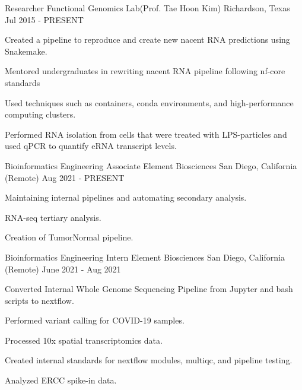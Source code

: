 

\begin{cventries}

	\cventry
	{Researcher} %
	{Functional Genomics Lab(Prof. Tae Hoon Kim)} %
	{Richardson, Texas} %
	{Jul 2015 - PRESENT} %
	{
		\begin{cvitems} %
			\item {Created a pipeline to reproduce and create new nacent RNA
			            predictions using Snakemake.}
			\item {Mentored undergraduates in rewriting nacent RNA pipeline following nf-core standards}
			\item {Used techniques such as containers, conda environments, and
			            high-performance computing clusters.}
			\item {Performed RNA isolation from cells that were treated with LPS-particles and used qPCR to quantify eRNA transcript levels.}
		\end{cvitems}
	}

	\cventry
	{Bioinformatics Engineering Associate} %
	{Element Biosciences} %
	{San Diego, California (Remote)} %
	{Aug 2021 - PRESENT} %
	{
		\begin{cvitems} %
			\item {Maintaining internal pipelines and automating secondary analysis.}
			\item {RNA-seq tertiary analysis.}
			\item {Creation of TumorNormal pipeline.}
		\end{cvitems}
	}

	\cventry
	{Bioinformatics Engineering Intern} %
	{Element Biosciences} %
	{San Diego, California (Remote)} %
	{June 2021 - Aug 2021} %
	{
		\begin{cvitems} %
			\item {Converted Internal Whole Genome Sequencing Pipeline from Jupyter and bash scripts to nextflow.}
			\item {Performed variant calling for COVID-19 samples.}
			\item {Processed 10x spatial transcriptomics data.}
			\item {Created internal standards for nextflow modules, multiqc, and pipeline testing.}
			\item {Analyzed ERCC spike-in data.}
		\end{cvitems}
	}


\end{cventries}
